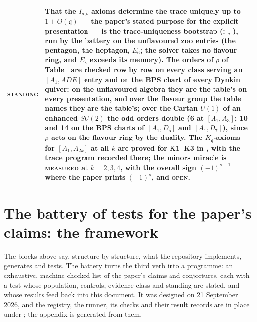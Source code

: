 \documentclass[11pt]{amsart}
\makeatletter
\newcommand\fq{\mathfrak{q}}
\theoremstyle{remark}
\newcommand{\pref}[1]{\@ifundefined{r@P-#1}{\textup{[\texttt{\detokenize{#1}}]}}{\ref{P-#1}}}
\newcommand{\MEASURED}{\textsc{measured}}
\newcommand{\OPEN}{\textsc{open}}
\newenvironment{machinery}{%
  \leavevmode\par\medskip\noindent
  \begin{tabular}{@{}>{\scshape}p{2.1cm}>{\raggedright\arraybackslash}p{\dimexpr\linewidth-2.5cm\relax}@{}}\toprule}%
  {\bottomrule\end{tabular}\par\medskip}
\makeatother
\begin{document}
\begin{machinery}
standing & That the $I_{a,b}$ axioms determine the trace uniquely up to $1+O(\fq)$ --- the paper's stated purpose for the explicit presentation --- is the trace-uniqueness bootstrap (\file{src/cone/trace_uniqueness.py}: \code{trace_solution_space}, \code{verify_unique_up_to_rescale}), run by the battery on the unflavoured zoo entries (the pentagon, the heptagon, $E_6$; the solver takes no flavour ring, and $E_8$ exceeds its memory).  The orders of $\rho$ of Table~\pref{tab:finite_type} are checked row by row on every class serving an $[A_1,ADE]$ entry and on the BPS chart of every Dynkin quiver: on the unflavoured algebra they are the table's on every presentation, and over the flavour group the table names they are the table's; over the Cartan $U(1)$ of an enhanced $SU(2)$ the odd orders double (6 at $[A_1,A_3]$; 10 and 14 on the BPS charts of $[A_1,D_5]$ and $[A_1,D_7]$), since $\rho$ acts on the flavour ring by the duality.  The $K_\fq$-axioms for $[A_1,A_{2k}]$ at all $k$ are proved for K1--K3 in \file{notes/a1a2k_kq_proof.md}, with the trace program recorded there; the minors miracle is \MEASURED{} at $k=2,3,4$, with the overall sign $(-1)^{s+1}$ where the paper prints $(-1)^s$, and \OPEN{}. \\
\end{machinery}

\section{The battery of tests for the paper's claims: the framework}\label{sec:battery}
The blocks above say, structure by structure, what the repository implements,
generates and tests.  The battery turns the third verb into a programme: an
exhaustive, machine-checked list of the paper's claims and conjectures, each
with a test whose population, controls, evidence class and standing are
stated, and whose results feed back into this document.  It was designed on
21 September 2026, and the registry, the runner, its checks and their
result records are in place under ; the appendix is
generated from them.
\end{document}
